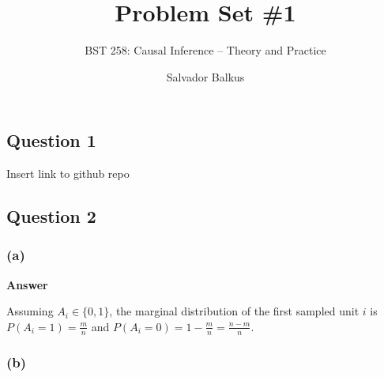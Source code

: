\documentclass[
  11pt,
  letterpaper,
  DIV=11,
  numbers=noendperiod]{scrartcl}
\title{Problem Set \#1}
\subtitle{BST 258: Causal Inference -- Theory and Practice}
\author{Salvador Balkus}
\date{}
\begin{document}
\maketitle
\hypertarget{question-1}{%
\subsection{Question 1}\label{question-1}}

Insert link to github repo

\hypertarget{question-2}{%
\subsection{Question 2}\label{question-2}}

\hypertarget{a}{%
\subsubsection{(a)}\label{a}}

\begin{tcolorbox}[enhanced jigsaw, breakable, leftrule=.75mm, toprule=.15mm, arc=.35mm, bottomrule=.15mm, left=2mm, opacityback=0, colback=white, colframe=quarto-callout-note-color-frame, rightrule=.15mm]

\textbf{Answer}\vspace{2mm}

Assuming \(A_i \in \{0, 1\}\), the marginal distribution of the first
sampled unit \(i\) is \(P(A_i = 1) = \frac{m}{n}\) and
\(P(A_i = 0) = 1 - \frac{m}{n} = \frac{n - m}{n}\).

\end{tcolorbox}

\hypertarget{b}{%
\subsubsection{(b)}\label{b}}
\end{document}
